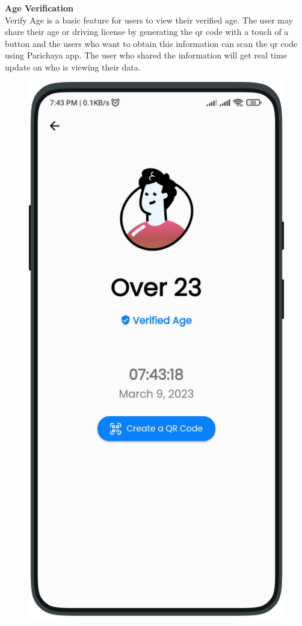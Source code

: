         \textbf{Age Verification}\\
        Verify Age is a basic feature for users to view their verified age. The user may share their age or driving license by generating the qr code with a touch of a button and the users who want to obtain this information can scan the qr code using Parichaya app. The user who shared the information will get real time update on who is viewing their data.
        \begin{multicols}{3}
            \begin{figure}[H]
            \centering
            \includegraphics[width=0.8\linewidth]{images/results/mobile/VerifyAge.png}

\end{figure}
\end{multicols}
